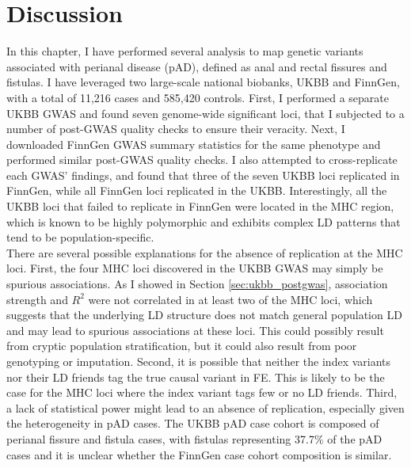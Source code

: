 \newpage
\section{Discussion}
In this chapter, I have performed several analysis to map genetic variants associated with perianal disease (pAD), defined as anal and rectal fissures and fistulas. I have leveraged two large-scale national biobanks, UKBB and FinnGen, with a total of 11,216 cases and 585,420 controls. First, I performed a separate UKBB GWAS and found seven genome-wide significant loci, that I subjected to a number of post-GWAS quality checks to ensure their veracity. Next, I downloaded FinnGen GWAS summary statistics for the same phenotype and performed similar post-GWAS quality checks. I also attempted to cross-replicate each GWAS' findings, and found that three of the seven UKBB loci replicated in FinnGen, while all FinnGen loci replicated in the UKBB. Interestingly, all the UKBB loci that failed to replicate in FinnGen were located in the MHC region, which is known to be highly polymorphic and exhibits complex LD patterns that tend to be population-specific. \\

There are several possible explanations for the absence of replication at the MHC loci. First, the four MHC loci discovered in the UKBB GWAS may simply be spurious associations. As I showed in Section \ref{sec:ukbb_postgwas}, association strength and $R^{2}$ were not correlated in at least two of the MHC loci, which suggests that the underlying LD structure does not match general population LD and may lead to spurious associations at these loci. This could possibly result from cryptic population stratification, but it could also result from poor genotyping or imputation. Second, it is possible that neither the index variants nor their LD friends tag the true causal variant in FE. This is likely to be the case for the MHC loci where the index variant tags few or no LD friends. Third, a lack of statistical power might lead to an absence of replication, especially given the heterogeneity in pAD cases. The UKBB pAD case cohort is composed of perianal fissure and fistula cases, with fistulas representing 37.7\% of the pAD cases and it is unclear whether the FinnGen case cohort composition is similar. \\


